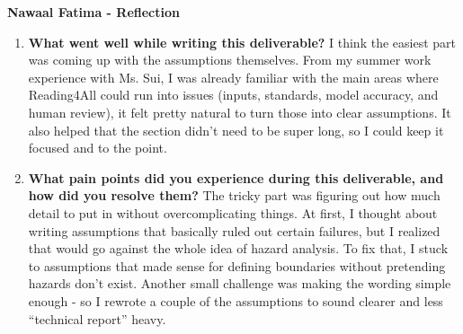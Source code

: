 \documentclass{article}
\begin{document}
\textbf{Nawaal Fatima  - Reflection}
\begin{enumerate}
  \item \textbf{What went well while writing this deliverable?}\newline
    I think the easiest part was coming up with the assumptions
    themselves. From my summer work experience with Ms. Sui, I was already familiar with the main areas where Reading4All
    could run into issues (inputs, standards, model accuracy, and
    human review), it felt pretty natural to turn those into clear
    assumptions. It also helped that the section didn’t need to be
    super long, so I could keep it focused and to the point.

  \item \textbf{What pain points did you experience during this
    deliverable, and how did you resolve them?}\newline
    The tricky part was figuring out how much detail to put in
    without overcomplicating things. At first, I thought about
    writing assumptions that basically ruled out certain failures,
    but I realized that would go against the whole idea of hazard
    analysis. To fix that, I stuck to assumptions that made sense for
    defining boundaries without pretending hazards don’t exist.
    Another small challenge was making the wording simple enough - so
    I rewrote a couple of the assumptions to sound clearer and less
    ``technical report'' heavy.
\end{enumerate}
\end{document}

